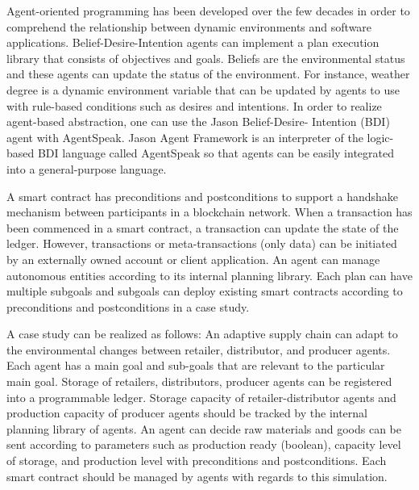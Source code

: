 


\begin{task}[] %
	\minisec{\objectivesname}\smallskip	
	Agent-oriented programming has been developed over the few decades in order to comprehend the relationship between dynamic environments and software applications. Belief-Desire-Intention agents can implement a plan execution library that consists of objectives and goals. Beliefs are the environmental status and these agents can update the status of the environment. For instance, weather degree is a dynamic environment variable that can be updated by agents to use with rule-based conditions such as desires and intentions. In order to realize agent-based abstraction, one can use the Jason Belief-Desire- Intention (BDI) agent with AgentSpeak. Jason Agent Framework is an interpreter of the logic- based BDI language called AgentSpeak so that agents can be easily integrated into a general-purpose language.
 
    \vspace{.5cm}
    
    A smart contract has preconditions and postconditions to support a handshake mechanism between participants in a blockchain network. When a transaction has been commenced in a smart contract, a transaction can update the state of the ledger. However, transactions or meta-transactions (only data) can be initiated by an externally owned account or client application. An agent can manage autonomous entities according to its internal planning library. Each plan can have multiple subgoals and subgoals can deploy existing smart contracts according to preconditions and postconditions in a case study. 
    
    \vspace{.5cm}
    
    A case study can be realized as follows: An adaptive supply chain can adapt to the environmental changes between retailer, distributor, and producer agents. Each agent has a main goal and sub-goals that are relevant to the particular main goal. Storage of retailers, distributors, producer agents can be registered into a programmable ledger. Storage capacity of retailer-distributor agents and production capacity of producer agents should be tracked by the internal planning library of agents. An agent can decide raw materials and goods can be sent according to parameters such as production ready (boolean), capacity level of storage, and production level with preconditions and postconditions. Each smart contract should be managed by agents with regards to this simulation.
    

\end{task}
